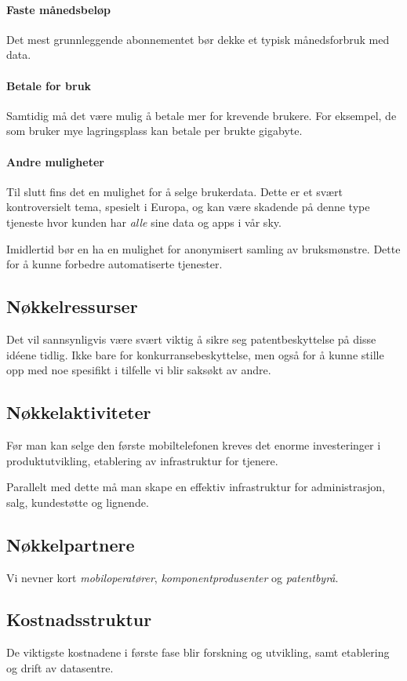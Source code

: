 \paragraph{Faste månedsbeløp}
Det mest grunnleggende abonnementet bør dekke et typisk månedsforbruk med data.

\paragraph{Betale for bruk}
Samtidig må det være mulig å betale mer for krevende brukere. For eksempel, de
som bruker mye lagringsplass kan betale per brukte gigabyte.

\paragraph{Andre muligheter}
Til slutt fins det en mulighet for å selge brukerdata. Dette er et svært
kontroversielt tema, spesielt i Europa, og kan være skadende på denne type
tjeneste hvor kunden har \textit{alle} sine data og apps i vår sky.  

Imidlertid bør en ha en mulighet for anonymisert samling av bruksmønstre. Dette
for å kunne forbedre automatiserte tjenester.

\subsection{Nøkkelressurser}

Det vil sannsynligvis være svært viktig å sikre seg patentbeskyttelse på disse
idéene tidlig. Ikke bare for konkurransebeskyttelse, men også for å kunne
stille opp med noe spesifikt i tilfelle vi blir saksøkt av andre.

\subsection{Nøkkelaktiviteter}

Før man kan selge den første mobiltelefonen kreves det enorme investeringer i
produktutvikling, etablering av infrastruktur for tjenere.

Parallelt med dette må man skape en effektiv infrastruktur for administrasjon,
salg, kundestøtte og lignende.

\subsection{Nøkkelpartnere}

Vi nevner kort \textit{mobiloperatører}, \textit{komponentprodusenter} og
\textit{patentbyrå}.

\subsection{Kostnadsstruktur}

De viktigste kostnadene i første fase blir forskning og utvikling, samt
etablering og drift av datasentre.

